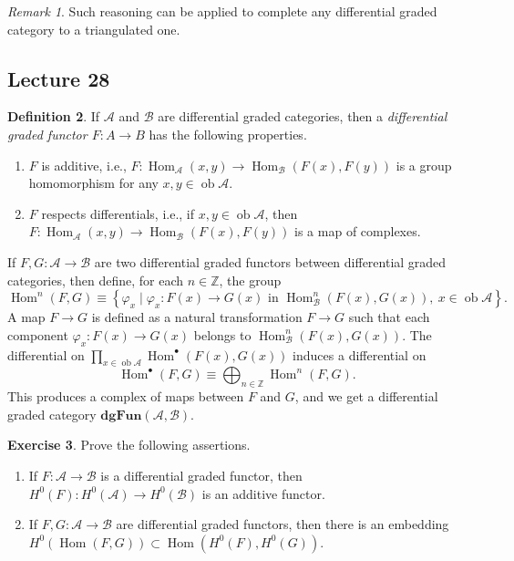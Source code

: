 \documentclass[10pt,letterpaper,cm]{nupset}
\theoremstyle{definition}
\newtheorem{definition}{Definition}[subsection]
\theoremstyle{theorem}
\newtheorem{exercise}[definition]{Exercise}
\theoremstyle{remark}
\newtheorem{remark}[definition]{Remark}
\newcommand{\Z}{\mathbb Z}
\newcommand{\1}{\mathbf{1}}
\renewcommand{\a}{\mathscr{A}}
\renewcommand{\b}{\mathscr{B}}
\newcommand{\0}{\vec 0}
\DeclareMathOperator{\ob}{ob}
\DeclareMathOperator{\Hom}{Hom}
\begin{document}
\begin{remark}
Such reasoning can be applied to complete any differential graded category to a triangulated one.
\end{remark}

\subsection{Lecture 28}

\begin{definition}
If $\a$ and $\b$ are differential graded categories, then a \textit{differential graded functor $F: A \to B$} has the following properties.
\begin{enumerate}[label=(\roman*)]
\item $F$ is additive, i.e., $F : \Hom_{\a}(x,y) \to \Hom_{\b}(F(x), F(y))$ is a group homomorphism for any $x,y \in \ob{\a}$.
\item $F$ respects differentials, i.e., if $x,y \in \ob{\a}$, then $F : \Hom_{\a}(x,y) \to \Hom_{\b}(F(x), F(y))$ is a map of complexes.
\end{enumerate}
\end{definition}

\smallskip

If $F, G : \a \to \b$ are two differential graded functors between differential graded categories, then define, for each $n \in \Z$, the group $$\Hom^n(F, G) \equiv \left\{\varphi_x \mid \varphi_x : F(x) \to G(x) \text{ in } \Hom_{\b}^n(F(x), G(x)), \ x \in \ob{\a} \right\}.$$ A map $F \to G$ is defined as a natural transformation $F\to G$ such that each component $\varphi_x: F(x) \to G(x)$ belongs to $\Hom^n_{\b}(F(x), G(x))$. The differential on $\prod_{x \in \ob{\a}} \Hom^{\bullet}(F(x), G(x))$ induces a differential on $$\Hom^{\bullet}(F, G) \equiv \bigoplus_{n \in \Z}\Hom^n(F,G).$$ This produces a complex of maps between $F$ and $G$, and we get a differential graded category $\mathbf{dgFun}(\a, \b)$.


\begin{exercise} Prove the following assertions.
\begin{enumerate}
\item If $F : \a \to \b$ is a differential graded functor, then $H^0(F) : H^0(\a) \to H^0(\b)$ is an additive functor.
\item If $F, G : \a \to \b$ are differential graded functors, then there is an embedding $H^0(\Hom(F, G)) \subset \Hom(H^0(F), H^0(G))$.
\end{enumerate}
\end{exercise}
\end{document}
